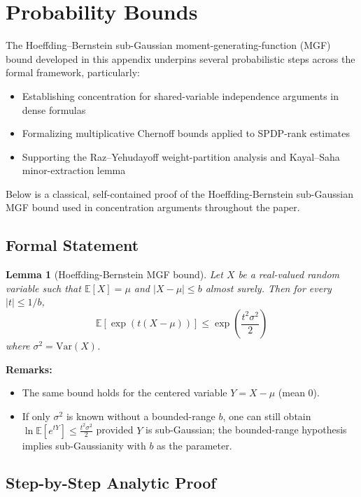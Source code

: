 \documentclass[12pt]{article}
\newtheorem{lemma}[theorem]{Lemma}
\theoremstyle{definition}
\theoremstyle{definition}
\theoremstyle{remark}
\theoremstyle{remark}
\begin{document}
\section{Probability Bounds}

The Hoeffding--Bernstein sub-Gaussian moment-generating-function (MGF) bound developed in this appendix underpins several probabilistic steps across the formal framework, particularly:
\begin{itemize}
\item Establishing concentration for shared-variable independence arguments in dense formulas
\item Formalizing multiplicative Chernoff bounds applied to SPDP-rank estimates
\item Supporting the Raz--Yehudayoff weight-partition analysis and Kayal--Saha minor-extraction lemma
\end{itemize}

Below is a classical, self-contained proof of the Hoeffding-Bernstein sub-Gaussian MGF bound used in concentration arguments throughout the paper.

\subsection{Formal Statement}

\begin{lemma}[Hoeffding-Bernstein MGF bound]\label{lem:hoeffding-bernstein}
Let $X$ be a real-valued random variable such that $\mathbb{E}[X] = \mu$ and $|X - \mu| \leq b$ almost surely. Then for every $|t| \leq 1/b$,
\[
\mathbb{E}[\exp(t(X - \mu))] \leq \exp\left(\frac{t^2\sigma^2}{2}\right)
\]
where $\sigma^2 = \text{Var}(X)$.
\end{lemma}

\textbf{Remarks:}
\begin{itemize}
\item The same bound holds for the centered variable $Y = X - \mu$ (mean 0).
\item If only $\sigma^2$ is known without a bounded-range $b$, one can still obtain $\ln\mathbb{E}[e^{tY}] \leq \frac{t^2\sigma^2}{2}$ provided $Y$ is sub-Gaussian; the bounded-range hypothesis implies sub-Gaussianity with $b$ as the parameter.
\end{itemize}

\subsection{Step-by-Step Analytic Proof}
\end{document}
